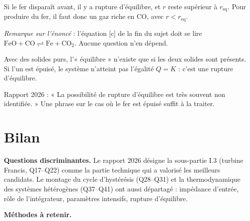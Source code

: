 \documentclass[11pt,a4paper]{article}
\begin{document}
Si le fer disparaît avant, il y a rupture d'équilibre, et \(r\) reste supérieur à \(r_{\text{eq}}\). Pour produire du fer, il faut donc un gaz riche en CO, avec \(r<r_{\text{eq}}\).

\emph{Remarque sur l'énoncé} : l'équation {[}c{]} de la fin du sujet doit se lire \(\mathrm{FeO} + \mathrm{CO} \rightleftharpoons \mathrm{Fe} + \mathrm{CO_2}\). Aucune question n'en dépend.

\begin{piege}

Avec des solides purs, l'« équilibre » n'existe que si les deux solides sont présents. Si l'un est épuisé, le système n'atteint pas l'égalité \(Q=K\) : c'est une rupture d'équilibre.

\end{piege}

\begin{jury}

Rapport 2026 : « La possibilité de rupture d'équilibre est très souvent non identifiée. » Une phrase sur le cas où le fer est épuisé suffit à la traiter.

\end{jury}

\hypertarget{bilan}{%
\section{Bilan}\label{bilan}}

\textbf{Questions discriminantes.} Le rapport 2026 désigne la sous-partie I.3 (turbine Francis, Q17--Q22) comme la partie technique qui a valorisé les meilleurs candidats. Le montage du cycle d'hystérésis (Q28--Q31) et la thermodynamique des systèmes hétérogènes (Q37--Q41) ont aussi départagé : impédance d'entrée, rôle de l'intégrateur, paramètres intensifs, rupture d'équilibre.

\textbf{Méthodes à retenir.}
\end{document}
